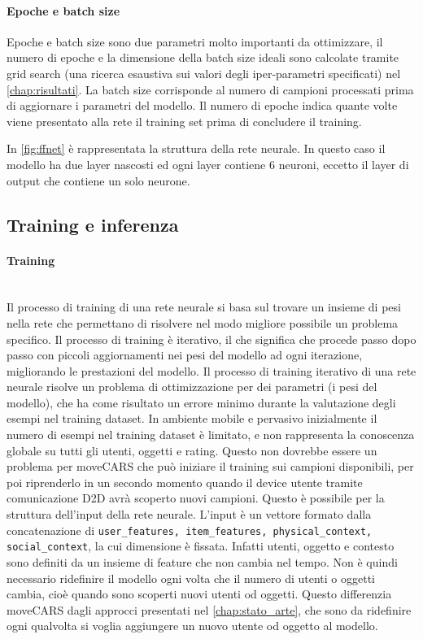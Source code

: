 \documentclass[12pt,italian]{report}
\newcommand{\myparagraph}[1]{\paragraph{#1}\mbox{}\\} %
\begin{document}
\paragraph{Epoche e batch size}
Epoche e batch size sono due parametri molto importanti da ottimizzare, il numero di epoche e la dimensione della batch size ideali sono calcolate tramite grid search (una ricerca esaustiva sui valori degli iper-parametri specificati) nel \autoref{chap:risultati}. La batch size corrisponde al numero di campioni processati prima di aggiornare i parametri del modello. Il numero di epoche indica quante volte viene presentato alla rete il training set prima di concludere il training.

\bigskip
In \autoref{fig:ffnet} è rappresentata la struttura della rete neurale. In questo caso il modello ha due layer nascosti ed ogni layer contiene 6 neuroni, eccetto il layer di output che contiene un solo neurone.

\subsection{Training e inferenza} \label{subsec: training}
\myparagraph{Training}
Il processo di training di una rete neurale si basa sul trovare un insieme di pesi nella rete che permettano di risolvere nel modo migliore possibile un problema specifico. Il processo di training è iterativo, il che significa che procede passo dopo passo con piccoli aggiornamenti nei pesi del modello ad ogni iterazione, migliorando le prestazioni del modello. Il processo di training iterativo di una rete neurale risolve un problema di ottimizzazione per dei parametri (i pesi del modello), che ha come risultato un errore minimo durante la valutazione degli esempi nel training dataset. In ambiente mobile e pervasivo inizialmente il numero di esempi nel training dataset è limitato, e non rappresenta la conoscenza globale su tutti gli utenti, oggetti e rating. Questo non dovrebbe essere un problema per moveCARS che può iniziare il training sui campioni disponibili, per poi riprenderlo in un secondo momento quando il device utente tramite comunicazione D2D avrà scoperto nuovi campioni. Questo è possibile per la struttura dell'input della rete neurale. L'input è un vettore formato dalla concatenazione di \texttt{user\_features, item\_features, physical\_context, social\_context}, la cui dimensione è fissata. Infatti utenti, oggetto e contesto sono definiti da un insieme di feature che non cambia nel tempo. Non è quindi necessario ridefinire il modello ogni volta che il numero di utenti o oggetti cambia, cioè quando sono scoperti nuovi utenti od oggetti. Questo differenzia moveCARS dagli approcci presentati nel \autoref{chap:stato_arte}, che sono da ridefinire ogni qualvolta si voglia aggiungere un nuovo utente od oggetto al modello.
\end{document}

